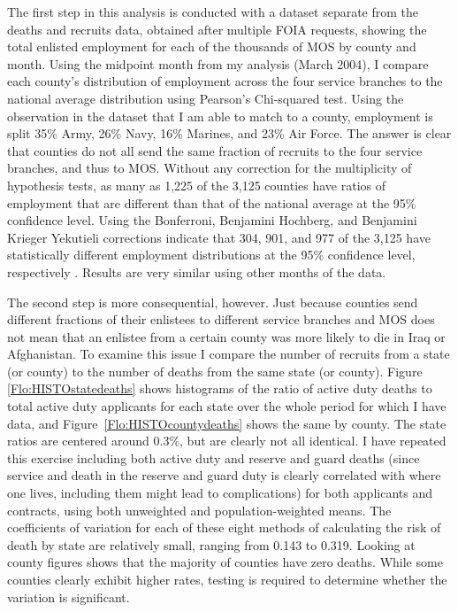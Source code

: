 \documentclass[12pt] {article}
\begin{document}
The first step in this analysis is conducted with a dataset separate from the deaths and recruits data, obtained after multiple FOIA requests, showing the total enlisted employment for each of the thousands of MOS by county and month. Using the midpoint month from my analysis (March 2004), I compare each county's distribution of employment across the four service branches to the national average distribution  using Pearson's Chi-squared test. Using the observation in the dataset that I am able to match to a county, employment is split 35\% Army, 26\% Navy, 16\% Marines, and 23\% Air Force. The answer is clear that counties do not all send the same fraction of recruits to the four service branches, and thus to MOS. Without any correction for the multiplicity of hypothesis tests, as many as 1,225 of the 3,125 counties have ratios of employment that are different than that of the national average at the 95\% confidence level. Using the Bonferroni, Benjamini Hochberg, and Benjamini Krieger Yekutieli corrections indicate that 304, 901, and 977 of the 3,125 have statistically different employment distributions at the 95\% confidence level, respectively \cite{BenHoch1995, BKY2006}. Results are very similar using other months of the data.

The second step is more consequential, however. Just because counties send different fractions of their enlistees to different service branches and MOS does not mean that an enlistee from a certain county was more likely to die in Iraq or Afghanistan. To examine this issue I compare the number of recruits from a state (or county) to the number of deaths from the same state (or county). Figure \ref{Flo:HISTOstatedeaths} shows histograms of the ratio of active duty deaths to total active duty applicants for each state over the whole period for which I have data, and  Figure~\ref{Flo:HISTOcountydeaths} shows the same by county. The state ratios are centered around 0.3\%, but are clearly not all identical. I have repeated this exercise including both active duty and reserve and guard deaths (since service and death in the reserve and guard duty is clearly correlated with where one lives, including them might lead to complications) for both applicants and contracts, using both unweighted and population-weighted means. The coefficients of variation for each
of these eight methods of calculating the risk of death by state are
relatively small, ranging from 0.143 to 0.319. Looking at county figures shows that the majority of counties have zero deaths. While some counties clearly exhibit higher rates, testing is required to determine whether the variation is significant. 
\end{document}
